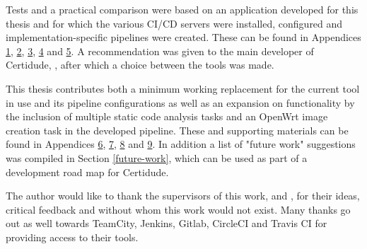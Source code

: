 Tests and a practical comparison were based on an application developed for this thesis and for which the various CI/CD servers were installed, configured and implementation-specific pipelines were created. These can be found in Appendices \hyperref[chapter:appendix-travis]{1}, \hyperref[chapter:appendix-jenkins]{2}, \hyperref[chapter:appendix-gitlab]{3}, \hyperref[chapter:appendix-tc]{4} and \hyperref[chapter:appendix-circleci]{5}. A recommendation was given to the main developer of Certidude, \supervisor, after which a choice between the tools was made.

This thesis contributes both a minimum working replacement for the current tool in use and its pipeline configurations as well as an expansion on functionality by the inclusion of multiple static code analysis tasks and an OpenWrt image creation task in the developed pipeline. These and supporting materials can be found in Appendices \hyperref[chapter:appendix-certidude-pipeline]{6}, \hyperref[chapter:appendix-sonar]{7}, \hyperref[chapter:appendix-vbox]{8} and \hyperref[chapter:appendix-openwrt]{9}. In addition a list of "future  work"  suggestions  was compiled in Section \ref{future-work}, which  can  be used  as part of  a  development road map for Certidude.

The author would like to thank the supervisors of this work, \cosupervisor{} and \supervisor, for their ideas, critical feedback and without whom this work would not exist. Many thanks go out as well towards TeamCity, Jenkins, Gitlab, CircleCI and Travis CI for providing access to their tools.